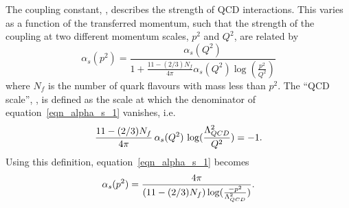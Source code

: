The coupling constant, \alphas, describes the strength of QCD interactions. This varies as a function of the transferred momentum, such that the strength of the coupling at two different momentum scales, $p^2$ and $Q^2$, are related by
\begin{equation}
\alpha_s(p^2) = \frac{\alpha_s(Q^2)}{1 + \frac{11 - (2/3) N_f}{4\pi}\alpha_s(Q^2) \log (\frac{p^2}{Q^2})}
\label{eqn_alpha_s_1}
\end{equation}
%
where $N_f$ is the number of quark flavours with mass less than $p^2$.
The ``QCD scale'', \lqcd, is defined as the scale at which the denominator of equation~\ref{eqn_alpha_s_1} vanishes, i.e.
\begin{equation}
\frac{11 - (2/3) N_f}{4\pi} \, \alpha_s(Q^2) \,\log (\frac{\Lambda_{QCD} ^2}{Q^2}) = -1.
\end{equation}
Using this definition, equation~\ref{eqn_alpha_s_1} becomes
\begin{equation}
\alpha_s(p^2) = \frac{4 \pi}{(11 - (2/3) N_f) \log (\frac{-p^2}{\Lambda_{QCD} ^2})}.
\label{eqn_alpha_s_3}
\end{equation}


